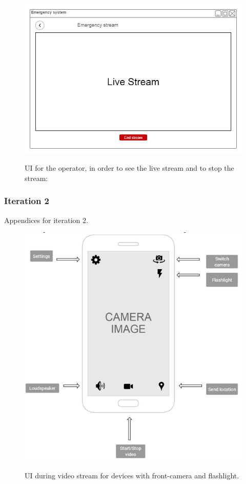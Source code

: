 \documentclass{article}
\begin{document}
	\begin{figure}[h]
		\centering
		\includegraphics[width=.9\textwidth]{"VideoStream/10"}

UI for the operator, in order to see the live stream and to stop the stream:
	\end{figure}\clearpage
    
    \subsubsection{Iteration 2} Appendices for iteration 2.
	
	\begin{figure}[h]
		\centering
		\includegraphics[width=.9\textwidth]{"VideoStream/11"}

		UI during video stream for devices with front-camera and flashlight.
	\end{figure} \clearpage
    
\end{document}
